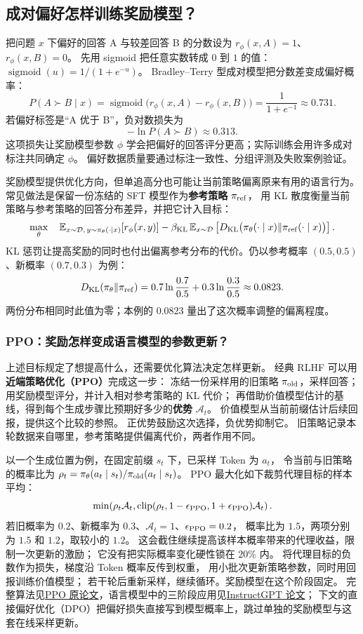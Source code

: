 \subsection{成对偏好怎样训练奖励模型？}
把问题 $x$ 下偏好的回答 A 与较差回答 B 的分数设为
$r_\phi(x,A)=1$、$r_\phi(x,B)=0$。
先用 sigmoid 把任意实数转成 $0$ 到 $1$ 的值：
$\operatorname{sigmoid}(u)=1/(1+e^{-u})$。
Bradley--Terry 型成对模型把分数差变成偏好概率：
\[
P(A\succ B\mid x)=\operatorname{sigmoid}\bigl(r_\phi(x,A)-r_\phi(x,B)\bigr)
=\frac{1}{1+e^{-1}}\approx\boxed{0.731}.
\]
若偏好标签是“A 优于 B”，负对数损失为
\[
-\ln P(A\succ B)\approx\boxed{0.313}.
\]
这项损失让奖励模型参数 $\phi$ 学会把偏好的回答评分更高；实际训练会用许多成对标注共同确定 $\phi$。
偏好数据质量要通过标注一致性、分组评测及失败案例验证。

奖励模型提供优化方向，但单追高分也可能让当前策略偏离原来有用的语言行为。
常见做法是保留一份冻结的 SFT 模型作为\textbf{参考策略} $\pi_{\rm ref}$，
用 KL 散度衡量当前策略与参考策略的回答分布差异，并把它计入目标：
\[
\max_\theta\quad
\mathbb E_{x\sim\mathcal D,\,y\sim\pi_\theta(\cdot\mid x)}[r_\phi(x,y)]
-\beta_{\rm KL}\,\mathbb E_{x\sim\mathcal D}
\left[D_{\rm KL}\bigl(\pi_\theta(\cdot\mid x)\Vert\pi_{\rm ref}(\cdot\mid x)\bigr)\right].
\]
KL 惩罚让提高奖励的同时也付出偏离参考分布的代价。仍以参考概率 $(0.5,0.5)$、新概率 $(0.7,0.3)$ 为例：
\[
D_{\rm KL}(\pi_\theta\Vert\pi_{\rm ref})
=0.7\ln\frac{0.7}{0.5}+0.3\ln\frac{0.3}{0.5}\approx0.0823.
\]
两份分布相同时此值为零；本例的 $0.0823$ 量出了这次概率调整的偏离程度。

\subsubsection*{PPO：奖励怎样变成语言模型的参数更新？}
\label{concept:ppo}
上述目标规定了想提高什么，还需要优化算法决定怎样更新。
经典 RLHF 可以用\textbf{近端策略优化（PPO）}完成这一步：
冻结一份采样用的旧策略 $\pi_{\rm old}$，采样回答；
用奖励模型评分，并计入相对参考策略的 KL 代价；
再借助价值模型估计的基线，得到每个生成步骤比预期好多少的\textbf{优势} $\mathcal A_t$。
价值模型从当前前缀估计后续回报，提供这个比较的参照。
正优势鼓励这次选择，负优势抑制它。
旧策略记录本轮数据来自哪里，参考策略提供偏离代价，两者作用不同。

以一个生成位置为例，在固定前缀 $s_t$ 下，已采样 Token 为 $a_t$，
令当前与旧策略的概率比为 $\rho_t=\pi_\theta(a_t\mid s_t)/\pi_{\rm old}(a_t\mid s_t)$。
PPO 最大化如下裁剪代理目标的样本平均：
\[
\min\!\left(\rho_t\mathcal A_t,
\operatorname{clip}(\rho_t,1-\epsilon_{\rm PPO},1+\epsilon_{\rm PPO})\mathcal A_t\right).
\]
若旧概率为 $0.2$、新概率为 $0.3$、$\mathcal A_t=1$、$\epsilon_{\rm PPO}=0.2$，
概率比为 $1.5$，两项分别为 $1.5$ 和 $1.2$，取较小的 $1.2$。
这会截住继续提高该样本概率带来的代理收益，限制一次更新的激励；
它没有把实际概率变化硬性锁在 $20\%$ 内。
将代理目标的负数作为损失，梯度沿 Token 概率反传到权重，
用小批次更新策略参数，同时用回报训练价值模型；
若干轮后重新采样，继续循环。奖励模型在这个阶段固定。
完整算法见\hyperref[source:ppo]{PPO 原论文}，语言模型中的三阶段应用见\hyperref[source:rlhf-ppo]{InstructGPT 论文}；
下文的直接偏好优化（DPO）把偏好损失直接写到模型概率上，跳过单独的奖励模型与这套在线采样更新。

